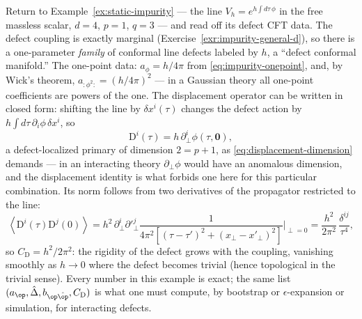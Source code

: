 \begin{eexample}
\label{ex:line-defect-cft}
Return to Example~\ref{ex:static-impurity} --- the line $V_h = e^{h\int
d\tau\, \phi}$ in the free massless scalar, $d = 4$, $p = 1$, $q = 3$
--- and read off its defect CFT data. The defect coupling is exactly
marginal (Exercise~\ref{exr:impurity-general-d}), so there is a
one-parameter \emph{family} of conformal line defects labeled by $h$, a
``defect conformal manifold.'' The one-point data: $a_\phi = h/4\pi$
from \eqref{eq:impurity-onepoint}, and, by Wick's theorem,
$a_{:\phi^2:} = (h/4\pi)^2$ --- in a Gaussian theory all one-point
coefficients are powers of the one. The displacement operator can be
written in closed form: shifting the line by $\delta x^i(\tau)$ changes
the defect action by $h\int d\tau\, \partial_i\phi\, \delta x^i$, so
\begin{equation}
\mathrm{D}^i(\tau) = h\, \partial^i_\perp \phi(\tau, \mathbf 0),
\end{equation}
a defect-localized primary of dimension $2 = p + 1$, as
\eqref{eq:displacement-dimension} demands --- in an interacting theory
$\partial_\perp\phi$ would have an anomalous dimension, and the
displacement identity is what forbids one here for this particular
combination. Its norm follows from two derivatives of the propagator
restricted to the line:
\begin{equation}
\left\langle \mathrm{D}^i(\tau) \mathrm{D}^j(0)\right\rangle
= h^2\, \partial^i_\perp \partial'^j_\perp
\frac{1}{4\pi^2\left[(\tau-\tau')^2 + (x_\perp - x'_\perp)^2\right]}
\bigg|_{\perp = 0}
= \frac{h^2}{2\pi^2}\, \frac{\delta^{ij}}{\tau^4},
\end{equation}
so $C_{\mathrm D} = h^2/2\pi^2$: the rigidity of the defect grows with
the coupling, vanishing smoothly as $h \to 0$ where the defect becomes
trivial (hence topological in the trivial sense). Every number in this
example is exact; the same list $(a_{\op}, \hat\Delta, b_{\op\hat\op},
C_{\mathrm D})$ is what one must compute, by bootstrap or
$\epsilon$-expansion or simulation, for interacting defects.
\end{eexample}


